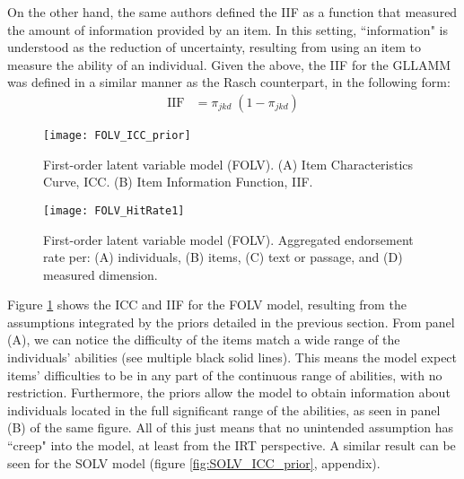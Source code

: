 On the other hand, the same authors defined the IIF as a function that measured the amount of information provided by an item. In this setting, ``information" is understood as the reduction of uncertainty, resulting from using an item to measure the ability of an individual. Given the above, the IIF for the GLLAMM was defined in a similar manner as the Rasch counterpart, in the following form:
%
\begin{equation} \label{eq:IIF}
	\begin{split}
		\text{IIF} &= \pi_{jkd} \; (1 - \pi_{jkd})
	\end{split}	
\end{equation}
%
\begin{figure}[H]
	\centering
	\texttt{[image: FOLV\_ICC\_prior]}
	\caption[First-order latent variable model (FOLV). Item Characteristic Curve (ICC) and Item Information Function (IIF).]%
	{First-order latent variable model (FOLV). (A) Item Characteristics Curve, ICC. (B) Item Information Function, IIF.}
	\label{fig:FOLV_ICC_prior}
\end{figure} 
%
\begin{figure}[H]
	\centering
	\texttt{[image: FOLV\_HitRate1]}
	\caption[First-order latent variable model (FOLV). Hit rate per dimensions of interest.]%
	{First-order latent variable model (FOLV). Aggregated endorsement rate per: (A) individuals, (B) items, (C) text or passage, and (D) measured dimension.}
	\label{fig:FOLV_hitrate1}
\end{figure}

Figure \ref{fig:FOLV_ICC_prior} shows the ICC and IIF for the FOLV model, resulting from the assumptions integrated by the priors detailed in the previous section. From panel (A), we can notice the difficulty of the items match a wide range of the individuals' abilities (see multiple black solid lines). This means the model expect items' difficulties to be in any part of the continuous range of abilities, with no restriction. Furthermore, the priors allow the model to obtain information about individuals located in the full significant range of the abilities, as seen in panel (B) of the same figure. All of this just means that no unintended assumption has ``creep" into the model, at least from the IRT perspective. A similar result can be seen for the SOLV model (figure \ref{fig:SOLV_ICC_prior}, appendix).

